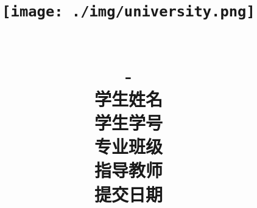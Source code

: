 \usepackage{tikz}%
\usepackage{graphicx} %
\usepackage{float} %
\usepackage{fancyhdr} %
\usepackage{multirow} %
\usepackage{longtable} %
\usepackage{array} %
\usepackage{makecell}%
\usepackage{threeparttable} %
\usepackage{booktabs}%
\usepackage{enumerate} %

\usepackage{algorithm}
\usepackage[noend]{algpseudocode}


\pagestyle{fancy}
\setlength{\headheight}{15pt}
\fancyhead[L]{\reportType}
\fancyhead[R]{\className \reportSemester}
\fancyhead[C]{}
\fancyfoot[C]{\thepage}

\setcounter{secnumdepth}{3}

\renewcommand{\figurename}{图} %

\renewcommand\theadset{\renewcommand\arraystretch{0.85}%
\setlength\extrarowheight{0pt}}%
\renewcommand\theadfont{\small}%
\renewcommand\theadalign{rt}%
\renewcommand\theadgape{\Gape[0.5cm][2mm]}%

\title{
  \begin{figure}[H]
    \centering
    \texttt{[image: ./img/university.png]}
  \end{figure} 
  \vspace{3em}
  \huge \textbf{\reportName} \\ 
  \vspace{1em}
  \large \textbf{\className-\reportType}\\
  \vspace{5em}
  \large 学生姓名\hspace{0.7cm}\underline{\makebox[5.5cm]{\studentName}} \\
  \large 学生学号\hspace{0.7cm}\underline{\makebox[5.5cm]{\studentID}} \\
  \large 专业班级\hspace{0.7cm}\underline{\makebox[5.5cm]{\studentGrade}} \\
  \large 指导教师\hspace{0.7cm}\underline{\makebox[5.5cm]{\prof}} \\
  \large 提交日期\hspace{0.7cm}\underline{} \\
}

\author{}
\date{}


